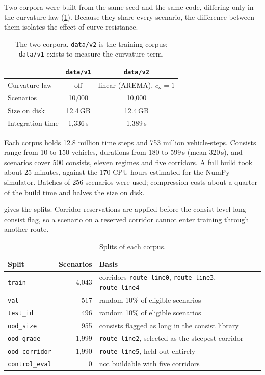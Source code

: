 Two corpora were built from the same seed and the same code, differing only in the curvature law (\cref{tab:dataset_corpora}). Because they share every scenario, the difference between them isolates the effect of curve resistance.

\begin{table}[htbp]
    \centering
    \begin{tabular}{lcc}
        \toprule
         & \texttt{data/v1} & \texttt{data/v2} \\
        \midrule
        Curvature law & off & linear (AREMA), $c_\kappa = 1$ \\
        Scenarios & 10,000 & 10,000 \\
        Size on disk & 12.4\,GB & 12.4\,GB \\
        Integration time & 1,336\,s & 1,389\,s \\
        \bottomrule
    \end{tabular}
    \caption{The two corpora. \texttt{data/v2} is the training corpus; \texttt{data/v1} exists to measure the curvature term.}
    \label{tab:dataset_corpora}
\end{table}

Each corpus holds 12.8 million time steps and 753 million vehicle-steps. Consists range from 10 to 150 vehicles, durations from 180 to 599\,s (mean 320\,s), and scenarios cover 500 consists, eleven regimes and five corridors. A full build took about 25 minutes, against the 170 CPU-hours estimated for the NumPy simulator. Batches of 256 scenarios were used; compression costs about a quarter of the build time and halves the size on disk.

 gives the splits. Corridor reservations are applied before the consist-level long-consist flag, so a scenario on a reserved corridor cannot enter training through another route.

\begin{table}[htbp]
    \centering
    \begin{tabular}{lrl}
        \toprule
        Split & Scenarios & Basis \\
        \midrule
        \texttt{train}         & 4,043 & corridors \texttt{route\_line0}, \texttt{route\_line3}, \texttt{route\_line4} \\
        \texttt{val}           & 517   & random 10\% of eligible scenarios \\
        \texttt{test\_id}      & 496   & random 10\% of eligible scenarios \\
        \texttt{ood\_size}     & 955   & consists flagged as long in the consist library \\
        \texttt{ood\_grade}    & 1,999 & \texttt{route\_line2}, selected as the steepest corridor \\
        \texttt{ood\_corridor} & 1,990 & \texttt{route\_line5}, held out entirely \\
        \texttt{control\_eval} & 0     & not buildable with five corridors \\
        \bottomrule
    \end{tabular}
    \caption{Splits of each corpus.}
    \label{tab:dataset_splits}
\end{table}

